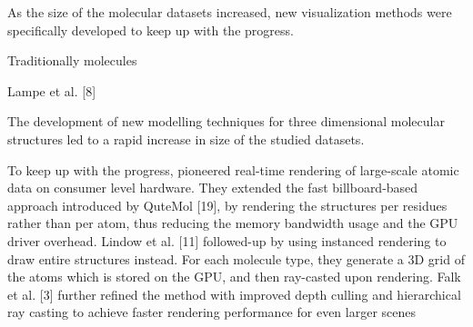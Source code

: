 As the size of the molecular datasets increased, new visualization methods were specifically developed to keep up with the progress. 

Traditionally molecules 


Lampe et al. [8] 

The development of new modelling techniques for three dimensional molecular structures led to a rapid increase in size of the studied datasets. 

To keep up with the progress, 
pioneered real-time rendering of large-scale atomic data on consumer
level hardware. They extended the fast billboard-based approach
introduced by QuteMol [19], by rendering the structures per residues
rather than per atom, thus reducing the memory bandwidth usage
and the GPU driver overhead. Lindow et al. [11] followed-up by
using instanced rendering to draw entire structures instead. For each
molecule type, they generate a 3D grid of the atoms which is stored on
the GPU, and then ray-casted upon rendering. Falk et al. [3] further
refined the method with improved depth culling and hierarchical ray
casting to achieve faster rendering performance for even larger scenes


%
%
%
%
%
%
%
%
%
%
%
%
%
%
%
%




